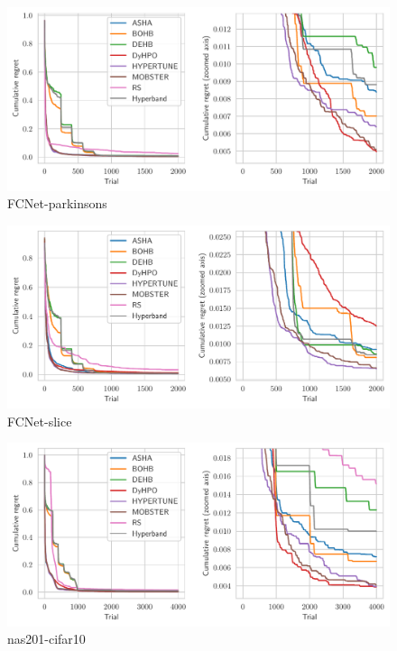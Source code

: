 \begin{figure}[H]
    \centering
    \includegraphics[scale=0.58]{img/tabular_exp/fcnet-parkinsons_plot.pdf}
    \caption{FCNet-parkinsons}
\end{figure}

\begin{figure}[H]
    \centering
    \includegraphics[scale=0.58]{img/tabular_exp/fcnet-slice_plot.pdf}
    \caption{FCNet-slice}
\end{figure}




\begin{figure}[H]
    \centering
    \includegraphics[scale=0.58]{img/tabular_exp/nas201-cifar10_plot.pdf}
    \caption{nas201-cifar10}
\end{figure}

